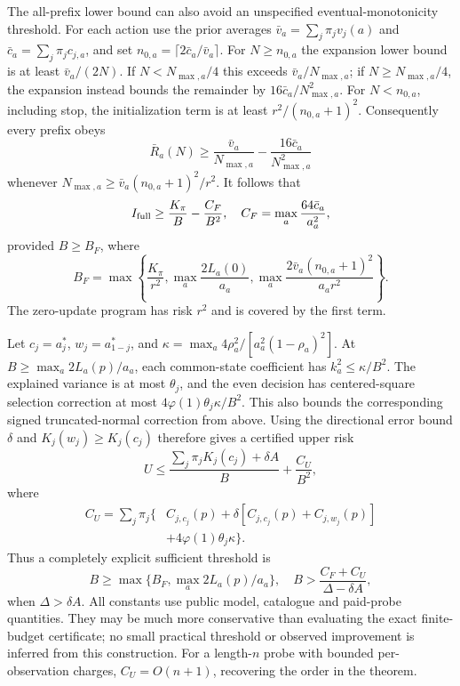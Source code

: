 The all-prefix lower bound can also avoid an unspecified eventual-monotonicity threshold.
For each action use the prior averages $\bar v_a=\sum_j\pi_jv_j(a)$ and $\bar c_a=\sum_j\pi_jc_{j,a}$, and set $n_{0,a}=\lceil2\bar c_a/\bar v_a\rceil$.
For $N\ge n_{0,a}$ the expansion lower bound is at least $\bar v_a/(2N)$.
If $N<N_{\max,a}/4$ this exceeds $\bar v_a/N_{\max,a}$; if $N\ge N_{\max,a}/4$, the expansion instead bounds the remainder by $16\bar c_a/N_{\max,a}^2$.
For $N<n_{0,a}$, including stop, the initialization term is at least $r^2/(n_{0,a}+1)^2$.
Consequently every prefix obeys
\[
\bar R_a(N)\ge\frac{\bar v_a}{N_{\max,a}}-\frac{16\bar c_a}{N_{\max,a}^2}
\]
whenever $N_{\max,a}\ge\bar v_a(n_{0,a}+1)^2/r^2$.
It follows that
\[
I_{\rm full}\ge\frac{K_\pi}B-\frac{C_F}{B^2},\quad
C_F=\max_a\frac{64\bar c_a}{a_a^2},
\]
provided $B\ge B_F$, where
\[
B_F=\max\left\{\frac{K_\pi}{r^2},\max_a\frac{2L_a(0)}{a_a},
\max_a\frac{2\bar v_a(n_{0,a}+1)^2}{a_ar^2}\right\}.
\]
The zero-update program has risk $r^2$ and is covered by the first term.

Let $c_j=a_j^*$, $w_j=a_{1-j}^*$, and $\kappa=\max_a4\rho_a^2/[a_a^2(1-\rho_a)^2]$.
At $B\ge\max_a2L_a(p)/a_a$, each common-state coefficient has $k_a^2\le\kappa/B^2$.
The explained variance is at most $\theta_j$, and the even decision has centered-square selection correction at most $4\varphi(1)\theta_j\kappa/B^2$.
This also bounds the corresponding signed truncated-normal correction from above.
Using the directional error bound $\delta$ and $K_j(w_j)\ge K_j(c_j)$ therefore gives a certified upper risk
\[
U\le\frac{\sum_j\pi_jK_j(c_j)+\delta A}{B}+\frac{C_U}{B^2},
\]
where
\begin{align*}
C_U=\sum_j\pi_j\{&C_{j,c_j}(p)+\delta[C_{j,c_j}(p)+C_{j,w_j}(p)]\\
&+4\varphi(1)\theta_j\kappa\}.
\end{align*}
Thus a completely explicit sufficient threshold is
\[
B\ge\max\{B_F,\max_a2L_a(p)/a_a\},\quad
B>\frac{C_F+C_U}{\Delta-\delta A},
\]
when $\Delta>\delta A$.
All constants use public model, catalogue and paid-probe quantities.
They may be much more conservative than evaluating the exact finite-budget certificate; no small practical threshold or observed improvement is inferred from this construction.
For a length-$n$ probe with bounded per-observation charges, $C_U=O(n+1)$, recovering the order in the theorem.

